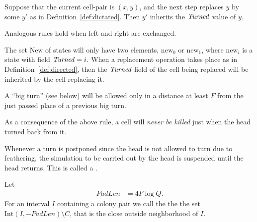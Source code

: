 \documentclass[11pt]{memoir}
\theoremstyle{definition} %
\newcommand{\fld}[1]{\ensuremath{\textit{#1\/}}}
\newcommand{\F}{F}
\newcommand{\Int}{\mathrm{Int}} %
\newcommand{\Q}{Q} %
\newcommand{\PadLen}{\mathit{PadLen}} %
\newcommand{\Turned}{\fld{Turned}} %
\newcommand{\New}{\mathrm{New}}
\newcommand{\new}{\mathrm{new}}
\begin{document}
Suppose that the current cell-pair is \( (x,y) \), and
the next step replaces \( y \) by some \( y' \) as in Definition~\ref{def:dictated}. 
Then \( y' \) inherits the \( \Turned \) value of \( y \).

Analogous rules hold when left and right are exchanged.

The set \( \New \) of states will only have two elements, \( \new_{0} \) or \( \new_{1} \), 
where \( \new_{i} \) is a state with field \( \Turned=i \).
When a replacement operation takes place as in Definition~\ref{def:directed}, then
the \( \Turned \) field of the cell being replaced will be inherited by the cell replacing it.

A ``big turn'' (see below)
will be allowed only in a distance at least \( \F \) from the just passed place of a previous
big turn.

\begin{remark}\label{rem:no-kill-on-turn}
As a consequence of the above rule, a cell will \emph{never be killed} just when
the head turned back from it.
\end{remark}

\begin{definition}[Digression]\label{def:digression}
Whenever a turn is postponed since the head is not allowed to turn due to feathering,
the simulation to be carried out by the head is suspended until the head returns.
This is called a .
\end{definition}

\begin{definition}\label{def:PadLen}
Let 
\begin{align}\label{eq:PadLen}
  \PadLen &= 4\F\log\Q.   
\end{align}
For an interval \( I \) containing a colony pair we call the 
the  the set \( \Int(I,-\PadLen)\setminus C \), that is the close
outside neighborhood of \( I \).
\end{definition}
\end{document}
